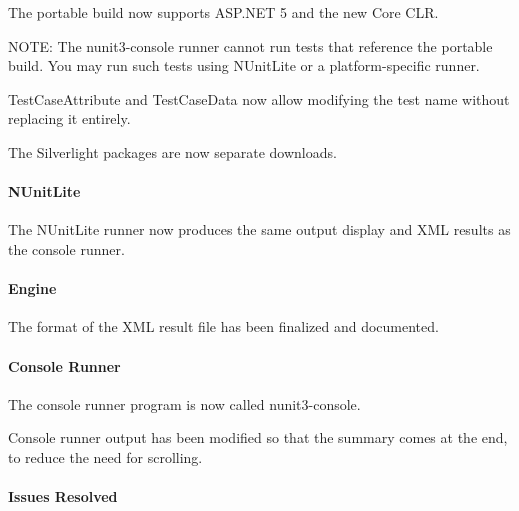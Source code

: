 \begin{DoxyItemize}
\item The portable build now supports A\+S\+P.\+N\+ET 5 and the new Core C\+LR.

N\+O\+TE\+: The {\ttfamily nunit3-\/console} runner cannot run tests that reference the portable build. You may run such tests using N\+Unit\+Lite or a platform-\/specific runner.
\item {\ttfamily Test\+Case\+Attribute} and {\ttfamily Test\+Case\+Data} now allow modifying the test name without replacing it entirely.
\item The Silverlight packages are now separate downloads.
\end{DoxyItemize}

\paragraph*{N\+Unit\+Lite}


\begin{DoxyItemize}
\item The N\+Unit\+Lite runner now produces the same output display and X\+ML results as the console runner.
\end{DoxyItemize}

\paragraph*{Engine}


\begin{DoxyItemize}
\item The format of the X\+ML result file has been finalized and documented.
\end{DoxyItemize}

\paragraph*{Console Runner}


\begin{DoxyItemize}
\item The console runner program is now called {\ttfamily nunit3-\/console}.
\item Console runner output has been modified so that the summary comes at the end, to reduce the need for scrolling.
\end{DoxyItemize}

\paragraph*{Issues Resolved}


